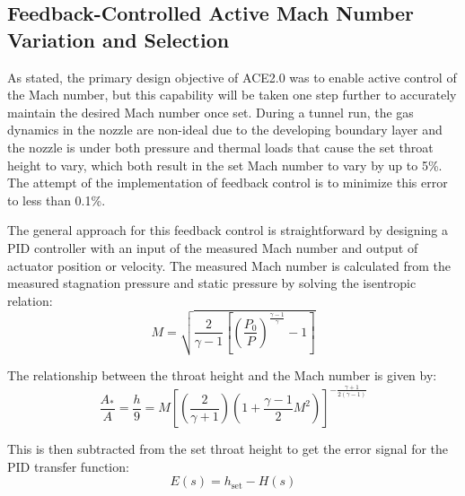 \subsection{Feedback-Controlled Active Mach Number Variation and Selection}

As stated, the primary design objective of ACE2.0 was to enable active control of the Mach number, but this capability will be taken one step further to accurately maintain the desired Mach number once set. During a tunnel run, the gas dynamics in the nozzle are non-ideal due to the developing boundary layer and the nozzle is under both pressure and thermal loads that cause the set throat height to vary, which both result in the set Mach number to vary by up to 5\%. The attempt of the implementation of feedback control is to minimize this error to less than 0.1\%.

The general approach for this feedback control is straightforward by designing a PID controller with an input of the measured Mach number and output of actuator position or velocity. The measured Mach number is calculated from the measured stagnation pressure and static pressure by solving the isentropic relation:
\begin{equation} 
    M = \sqrt{\frac{2}{\gamma - 1} \left[\left(\frac{P_0}{P}\right)^{\frac{\gamma - 1}{\gamma}} - 1\right]}
\end{equation}

\noindent The relationship between the throat height and the Mach number is given by:
\begin{equation}
    \frac{A_*}{A} = \frac{h}{9} = M \left[ \left( \frac{2}{\gamma+1}  \right) \left( 1 + \frac{\gamma-1}{2} M^2  \right) \right]^{-\frac{\gamma+1}{2(\gamma-1)} }
\end{equation}

\noindent This is then subtracted from the set throat height to get the error signal for the PID transfer function:
\begin{equation}
    E(s) = h_{\mathrm{set}} - H(s)
\end{equation}

